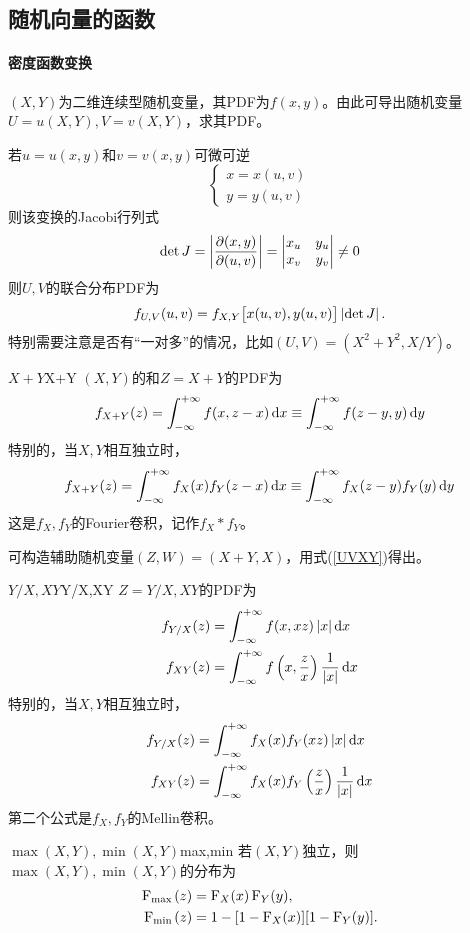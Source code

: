 \subsection{随机向量的函数}
\paragraph{密度函数变换}$(X,Y)$为二维连续型随机变量，其PDF为$f(x,y)$。由此可导出随机变量$U=u(X,Y),V=v(X,Y)$，求其PDF。

若$u=u(x,y)$和$v=v(x,y)$可微可逆
\[
	\begin{cases}
		x=x(u,v)\\
		y=y(u,v)
	\end{cases}
\]
则该变换的Jacobi行列式
\[
	\det J=\left\lvert\frac{\partial^{\;\!\!}(x,y)}{\partial (u,v)^{\;\!\!}}\right\rvert=\begin{vmatrix}
		x_u&y_u\\x_v&y_v
	\end{vmatrix}\neq 0
\]
则$U,V$的联合分布PDF为
\begin{align}\label{UVXY}
	f_{U,V}(u,v)=f_{X,Y}\bigl[x(u,v),y(u,v)\bigr]\left\lvert\det J\right\rvert.
\end{align}
特别需要注意是否有“一对多”的情况，比如$(U,V)=(X^2+Y^2,X/Y)$。
\begin{example}{$X+Y$}{X+Y}
	$(X,Y)$的和$Z=X+Y$的PDF为
	\begin{align}
		f_{X+Y}(z)=\int_{-\infty}^{+\infty} f(x,z-x)\mathop{}\!\mathrm{d} x\equiv\int_{-\infty}^{+\infty} f(z-y,y)\mathop{}\!\mathrm{d} y
	\end{align}
	特别的，当$X,Y$相互独立时，%
	\[
		f_{X+Y}(z)=\int_{-\infty}^{+\infty} f_X(x)f_Y(z-x)\mathop{}\!\mathrm{d} x\equiv\int_{-\infty}^{+\infty} f_X(z-y)f_Y(y)\mathop{}\!\mathrm{d} y
	\]
	这是$f_X,f_Y$的Fourier卷积，记作$f_X\ast f_Y$。
\end{example}
可构造辅助随机变量$(Z,W)=(X+Y,X)$，用式(\ref{UVXY})得出。
\begin{example}{$Y/X,XY$}{Y/X,XY}
	$Z=Y/X,XY$的PDF为
	\begin{align}
		f_{Y/X}(z)&=\int_{-\infty}^{+\infty} f(x,xz)\left\lvert x\right\rvert\mathop{}\!\mathrm{d} x\\
		f_{XY}(z)&=\int_{-\infty}^{+\infty} f\left(x,\frac zx\right)\frac1{\left\lvert x\right\rvert}\mathop{}\!\mathrm{d} x
	\end{align}
	特别的，当$X,Y$相互独立时，
	\begin{align*}
		f_{Y/X}(z)&=\int_{-\infty}^{+\infty} f_X(x)f_Y(xz)\left\lvert x\right\rvert\mathop{}\!\mathrm{d} x\\
		f_{XY}(z)&=\int_{-\infty}^{+\infty} f_X(x)f_Y\left(\frac zx\right)\frac1{\left\lvert x\right\rvert}\mathop{}\!\mathrm{d} x
	\end{align*}
	第二个公式是$f_X,f_Y$的Mellin卷积。
\end{example}
\begin{example}{$\max(X,Y),\min(X,Y)$}{max,min}
	若$(X,Y)$独立，则$\max(X,Y),\min(X,Y)$的分布为
	\begin{align}
		\operatorname{F}_{\max{}}(z)&=\operatorname{F}_X(x)\operatorname{F}_Y(y),\\
		\operatorname{F}_{\min{}}(z)&=1-[1-\operatorname{F}_X(x)][1-\operatorname{F}_Y(y)].
	\end{align}
\end{example}
